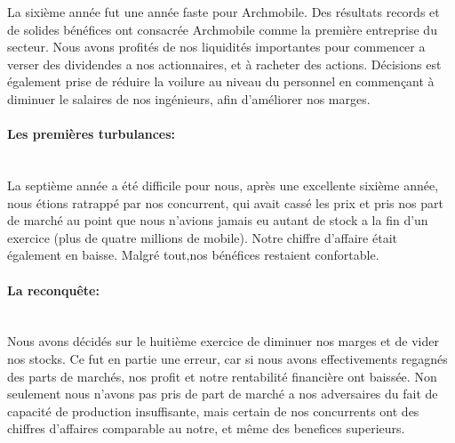 La sixième année fut une année faste pour Archmobile. Des résultats
records et de solides bénéfices ont consacrée Archmobile comme la
première entreprise du secteur. Nous avons profités de nos liquidités
importantes pour commencer a verser des dividendes a nos actionnaires,
et à racheter des actions. Décisions est également prise de réduire la
voilure au niveau du personnel en commençant à diminuer le salaires de
nos ingénieurs, afin d'améliorer nos marges.

\paragraph{Les premières turbulances:}~\\

La septième année a été difficile pour nous, après une excellente
sixième année, nous étions ratrappé par nos concurrent, qui avait
cassé les prix et pris nos part de marché au point que nous n'avions
jamais eu autant de stock a la fin d'un exercice (plus de quatre
millions de mobile). Notre chiffre d'affaire était également en baisse.
Malgré tout,nos bénéfices restaient confortable.

\paragraph{La reconquête:}~\\
 
Nous avons décidés sur le huitième exercice de diminuer nos marges et
de vider nos stocks.  Ce fut en partie une erreur, car si nous avons
effectivements regagnés des parts de marchés, nos profit et notre
rentabilité financière ont baissée. Non seulement nous n'avons pas
pris de part de marché a nos adversaires du fait de capacité de
production insuffisante, mais certain de nos concurrents ont des chiffres d'affaires 
comparable au notre, et même des benefices superieurs. 

